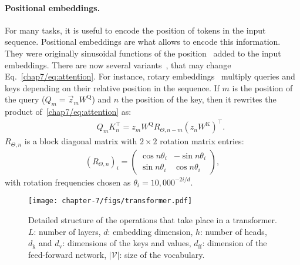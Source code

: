 \paragraph*{Positional embeddings.} 
For many tasks, it is useful to encode the position of tokens in the input sequence.
Positional embeddings are what allows to encode this information.
They were originally sinusoidal functions of the position~\citep{vaswani2017attention} added to the input embeddings. 
There are now several variants~\citep{raffel2020exploring, su2021roformer, press2021train, kazemnejad2023impact}, that may change Eq.~\eqref{chap7/eq:attention}.
For instance, rotary embeddings~\citep{su2021roformer} multiply queries and keys depending on their relative position in the sequence.
If $m$ is the position of the query ($Q_m= \vec{z}_m W^\mathrm{Q}$) and $n$ the position of the key, then it rewrites the product of~\eqref{chap7/eq:attention} as:
\vspace{-0.1cm}
\begin{align}\label{chap7/eq:rotary}
    \qquad Q_m K^\top_n = z_m W^\mathrm{Q} R_{\Theta, n-m} (z_n W^\mathrm{K})^\top.
\end{align}
$R_{\Theta,n}$ is a block diagonal matrix with $2\times2$ rotation matrix entries:
\vspace{-0.1cm}
\begin{align*}
   \left( R_{\Theta,n} \right) _i  =
   \begin{pmatrix}
   \cos n \theta_i & -\sin n \theta_i \\
   \sin n \theta_i & \cos n \theta_i
   \end{pmatrix},
\end{align*}
with rotation frequencies chosen as $\theta_i = 10,000^{-2i/d}$.

\begin{figure}[b!]
    \centering
    \texttt{[image: chapter-7/figs/transformer.pdf]}
    \caption{
    Detailed structure of the operations that take place in a transformer.
    $L$: number of layers, $d$: embedding dimension, $h$: number of heads, $d_\mathrm{k}$ and $d_\mathrm{v}$: dimensions of the keys and values, $d_\mathrm{ff}$: dimension of the feed-forward network, $|\mathcal V|$: size of the vocabulary.
    }\label{chap7/fig:transformer}
\end{figure}
